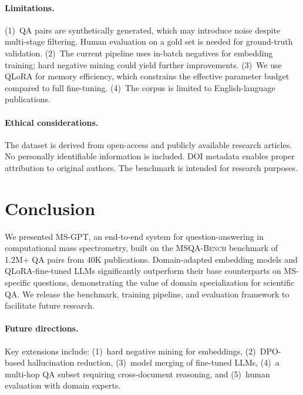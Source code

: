 \documentclass[11pt]{article}
\newcommand{\msgpt}{\textsc{MS-GPT}}
\newcommand{\msqa}{\textsc{MSQA-Bench}}
\begin{document}
\paragraph{Limitations.}
(1)~QA pairs are synthetically generated, which may introduce noise despite
multi-stage filtering. Human evaluation on a gold set is needed for
ground-truth validation.
(2)~The current pipeline uses in-batch negatives for embedding training;
hard negative mining could yield further improvements.
(3)~We use QLoRA for memory efficiency, which constrains the effective
parameter budget compared to full fine-tuning.
(4)~The corpus is limited to English-language publications.

\paragraph{Ethical considerations.}
The dataset is derived from open-access and publicly available research
articles. No personally identifiable information is included. DOI metadata
enables proper attribution to original authors. The benchmark is intended for
research purposes.


\section{Conclusion}
\label{sec:conclusion}

We presented \msgpt{}, an end-to-end system for question-answering in
computational mass spectrometry, built on the \msqa{} benchmark of 1.2M+ QA
pairs from 40K publications. Domain-adapted embedding models and
QLoRA-fine-tuned LLMs significantly outperform their base counterparts on
MS-specific questions, demonstrating the value of domain specialization for
scientific QA. We release the benchmark, training pipeline, and evaluation
framework to facilitate future research.

\paragraph{Future directions.}
Key extensions include: (1)~hard negative mining for embeddings,
(2)~DPO-based hallucination reduction, (3)~model merging of fine-tuned LLMs,
(4)~a multi-hop QA subset requiring cross-document reasoning, and
(5)~human evaluation with domain experts.
\end{document}
